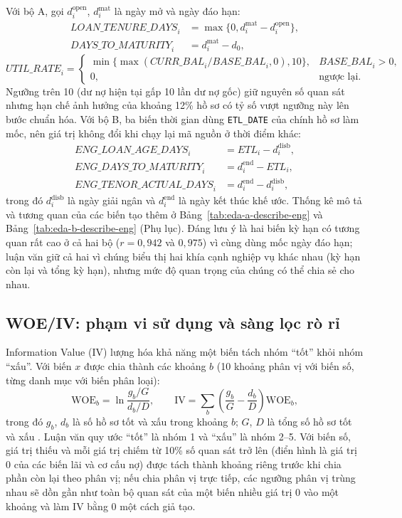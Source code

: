 Với bộ A, gọi $d_i^{\mathrm{open}}$, $d_i^{\mathrm{mat}}$ là ngày mở và ngày đáo hạn:
\[
\begin{aligned}
\mathit{LOAN\_TENURE\_DAYS}_i&=\max\{0,d_i^{\mathrm{mat}}-d_i^{\mathrm{open}}\},\\
\mathit{DAYS\_TO\_MATURITY}_i&=d_i^{\mathrm{mat}}-d_0,
\end{aligned}
\]
\[
\mathit{UTIL\_RATE}_i=
\begin{cases}
\min\{\max(\mathit{CURR\_BAL}_i/\mathit{BASE\_BAL}_i,0),10\}, & \mathit{BASE\_BAL}_i>0,\\
0, & \text{ngược lại}.
\end{cases}
\]
Ngưỡng trên 10 (dư nợ hiện tại gấp 10 lần dư nợ gốc) giữ nguyên số quan sát nhưng hạn chế ảnh hưởng của khoảng 12\% hồ sơ có tỷ số vượt ngưỡng này lên bước chuẩn hóa. Với bộ B, ba biến thời gian dùng \mbox{\texttt{ETL\_DATE}} của chính hồ sơ làm mốc, nên giá trị không đổi khi chạy lại mã nguồn ở thời điểm khác:
\[
\begin{aligned}
\mathit{ENG\_LOAN\_AGE\_DAYS}_i&=\mathit{ETL}_i-d_i^{\mathrm{disb}},\\
\mathit{ENG\_DAYS\_TO\_MATURITY}_i&=d_i^{\mathrm{end}}-\mathit{ETL}_i,\\
\mathit{ENG\_TENOR\_ACTUAL\_DAYS}_i&=d_i^{\mathrm{end}}-d_i^{\mathrm{disb}},
\end{aligned}
\]
trong đó $d_i^{\mathrm{disb}}$ là ngày giải ngân và $d_i^{\mathrm{end}}$ là ngày kết thúc khế ước. Thống kê mô tả và tương quan của các biến tạo thêm ở Bảng~\ref{tab:eda-a-describe-eng} và Bảng~\ref{tab:eda-b-describe-eng} (Phụ lục). Đáng lưu ý là hai biến kỳ hạn có tương quan rất cao ở cả hai bộ ($r=0,942$ và $0,975$) vì cùng dùng mốc ngày đáo hạn; luận văn giữ cả hai vì chúng biểu thị hai khía cạnh nghiệp vụ khác nhau (kỳ hạn còn lại và tổng kỳ hạn), nhưng mức độ quan trọng của chúng có thể chia sẻ cho nhau.

\subsection{WOE/IV: phạm vi sử dụng và sàng lọc rò rỉ}
\label{sec:iv-a}
\label{sec:iv-b}

Information Value (IV) lượng hóa khả năng một biến tách nhóm ``tốt'' khỏi nhóm ``xấu''. Với biến $x$ được chia thành các khoảng $b$ (10 khoảng phân vị với biến số, từng danh mục với biến phân loại):
\[
\mathrm{WOE}_b=\ln\frac{g_b/G}{d_b/D},\qquad
\mathrm{IV}=\sum_b\left(\frac{g_b}{G}-\frac{d_b}{D}\right)\mathrm{WOE}_b,
\]
trong đó $g_b$, $d_b$ là số hồ sơ tốt và xấu trong khoảng $b$; $G$, $D$ là tổng số hồ sơ tốt và xấu \cite{siddiqi2006credit}. Luận văn quy ước ``tốt'' là nhóm 1 và ``xấu'' là nhóm 2--5. Với biến số, giá trị thiếu và mỗi giá trị chiếm từ 10\% số quan sát trở lên (điển hình là giá trị 0 của các biến lãi và cơ cấu nợ) được tách thành khoảng riêng trước khi chia phần còn lại theo phân vị; nếu chia phân vị trực tiếp, các ngưỡng phân vị trùng nhau sẽ dồn gần như toàn bộ quan sát của một biến nhiều giá trị 0 vào một khoảng và làm IV bằng 0 một cách giả tạo.

